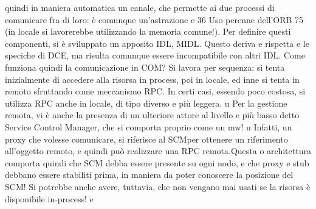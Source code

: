 \documentclass[a4paper,12pt]{article}
\begin{document}
quindi in maniera automatica un canale,
che permette ai due processi di comunicare fra di loro: è comunque un'astrazione
e
36 Uso
perenne dell'ORB
75
(in locale si lavorerebbe utilizzando la memoria comune!). Per definire questi
componenti, si è sviluppato un apposito IDL, MIDL. Questo deriva e rispetta
e
le speciche di DCE, ma risulta comunque essere incompatibile con altri IDL.
Come funziona quindi la comunicazione in COM? Si lavora per sequenza: si
tenta inizialmente di accedere alla risorsa in process, poi in locale, ed inne si
tenta in remoto sfruttando come meccanismo RPC. In certi casi, essendo poco
costosa, si utilizza RPC anche in locale, di tipo diverso e più leggera.
u
Per la gestione remota, vi è anche la presenza di un ulteriore attore al livello
e
più basso detto Service Control Manager, che si comporta proprio come un mw!
u
Infatti, un proxy che volesse comunicare, si riferisce al SCMper ottenere un
riferimento all'oggetto remoto, e quindi può realizzare una RPC remota.Questa
o
architettura comporta quindi che SCM debba essere presente su ogni nodo, e
che proxy e stub debbano essere stabiliti prima, in maniera da poter conoscere
la posizione del SCM! Si potrebbe anche avere, tuttavia, che non vengano mai
usati se la risorsa è disponibile in-process!
e
\end{document}
